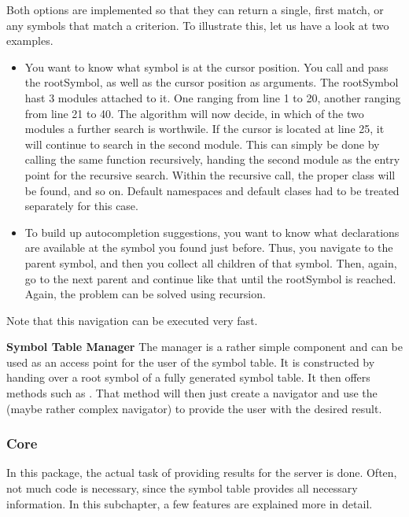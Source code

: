 Both options are implemented so that they can return a single, first match, or any symbols that match a criterion.
To illustrate this, let us have a look at two examples.
\begin{itemize}
    \item You want to know what symbol is at the cursor position.
    You call  and pass the rootSymbol, as well as the cursor position as arguments.
    The rootSymbol hast 3 modules attached to it.
    One ranging from line 1 to 20, another ranging from line 21 to 40.
    The algorithm will now decide, in which of the two modules a further search is worthwile.
    If the cursor is located at line 25, it will continue to search in the second module.
    This can simply be done by calling the same function recursively, handing the second module as the entry point for the recursive search.
    Within the recursive call, the proper class will be found, and so on.
    Default namespaces and default clases had to be treated separately for this case.
    \item To build up autocompletion suggestions, you want to know what declarations are available at the symbol you found just before.
    Thus, you navigate to the parent symbol, and then you collect all children of that symbol.
    Then, again, go to the next parent and continue like that until the rootSymbol is reached.
    Again, the problem can be solved using recursion.
\end{itemize}
Note that this navigation can be executed very fast.











\textbf{Symbol Table Manager}
The manager is a rather simple component and can be used as an access point for the user of the symbol table.
It is constructed by handing over a root symbol of a fully generated symbol table.
It then offers methods such as .
That method will then just create a navigator and use the (maybe rather complex navigator) to provide the user with the desired result.


\subsubsection{Core}
In this package, the actual task of providing results for the server is done.
Often, not much code is necessary, since the symbol table provides all necessary information.
In this subchapter, a few features are explained more in detail.

